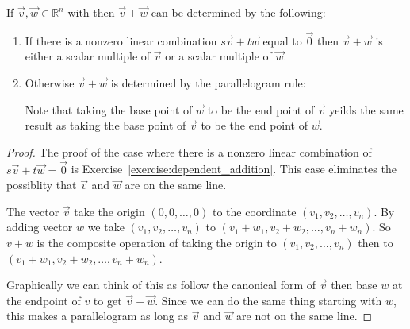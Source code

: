 \begin{proposition} If $\vec{v},\vec{w} \in \mathbb{R}^n$ with then $\vec{v}+\vec{w}$ can be determined by the following:
\begin{enumerate}
\item If there is a nonzero linear combination $s\vec{v}+t\vec{w}$ equal to $\vec{0}$ then 
$\vec{v}+\vec{w}$ is either a scalar multiple of $\vec{v}$ or a scalar multiple of $\vec{w}$.

\item Otherwise $\vec{v}+\vec{w}$ is determined by the parallelogram rule:\\

Note that taking the base point of $\vec{w}$ to be the end point of $\vec{v}$ yeilds the same result as taking the base point of $\vec{v}$ to be the end point of 
$\vec{w}$.
\end{enumerate}
\end{proposition}
\begin{proof}
The proof of the case where there is a nonzero linear combination of $s\vec{v}+t\vec{w}=\vec{0}$ is Exercise~\ref{exercise:dependent_addition}. This case eliminates the possiblity that $\vec{v}$ and $\vec{w}$ are on the same line.

The vector $\vec{v}$ take the origin $(0,0, \ldots, 0)$ to the coordinate $(v_1, v_2, \ldots, v_n)$. 
By adding vector $w$ we take $(v_1, v_2, \ldots, v_n)$ to $(v_1+w_1, v_2+w_2, \ldots, v_n+w_n)$. 
So $v+w$ is the composite operation of taking the origin to $(v_1, v_2, \ldots, v_n)$ then to $(v_1+w_1, v_2+w_2, \ldots, v_n+w_n)$. 

Graphically we can think of this as follow the canonical form of $\vec{v}$ then base $w$ at the endpoint of $v$ to get $\vec{v}+\vec{w}$. Since we can do the same thing starting with $w$, this makes a parallelogram as long as $\vec{v}$ and $\vec{w}$ are not on the same line.
\end{proof}

